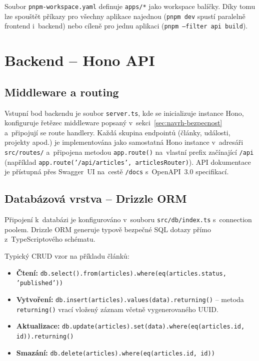 Soubor \texttt{pnpm-workspace.yaml} definuje \texttt{apps/*} jako workspace balíčky. Díky tomu lze spouštět příkazy pro všechny aplikace najednou (\texttt{pnpm dev} spustí paralelně frontend i~backend) nebo cíleně pro jednu aplikaci (\texttt{pnpm --filter api build}).

\section{Backend -- Hono API}

\subsection{Middleware a routing}

\begin{sloppypar}
Vstupní bod backendu je soubor \texttt{server.ts}, kde se inicializuje instance Hono, konfiguruje řetězec middleware popsaný v~sekci~\ref{sec:navrh-bezpecnost} a~připojují se route handlery. Každá skupina endpointů (články, události, projekty apod.) je implementována jako samostatná Hono instance v~adresáři \texttt{src/\allowbreak routes/} a~připojena metodou \texttt{app.route()} na~vlastní prefix začínající \texttt{/api} (například \texttt{app.route(\allowbreak '/api/\allowbreak articles',\allowbreak{} articles\-Router)}). API dokumentace je přístupná přes Swagger~UI na~cestě \texttt{/docs} s~OpenAPI~3.0 specifikací.
\end{sloppypar}

\subsection{Databázová vrstva -- Drizzle ORM}

Připojení k~databázi je konfigurováno v~souboru \texttt{src/db/index.ts} s~connection poolem. Drizzle ORM generuje typově bezpečné SQL dotazy přímo z~TypeScriptového schématu.

Typický CRUD vzor na příkladu článků:

\begin{sloppypar}
\begin{itemize}
    \item \textbf{Čtení:} \texttt{db.select().from(articles).\allowbreak where(\allowbreak eq(\allowbreak articles.status,\allowbreak{} 'published'))}
    \item \textbf{Vytvoření:} \texttt{db.insert(articles).\allowbreak values(data).\allowbreak returning()} -- metoda \texttt{returning()} vrací vložený záznam včetně vygenerovaného UUID.
    \item \textbf{Aktualizace:} \texttt{db.update(articles).\allowbreak set(data).\allowbreak where(\allowbreak eq(\allowbreak articles.id,\allowbreak{} id)).\allowbreak returning()}
    \item \textbf{Smazání:} \texttt{db.delete(articles).\allowbreak where(\allowbreak eq(\allowbreak articles.id,\allowbreak{} id))}
\end{itemize}
\end{sloppypar}

